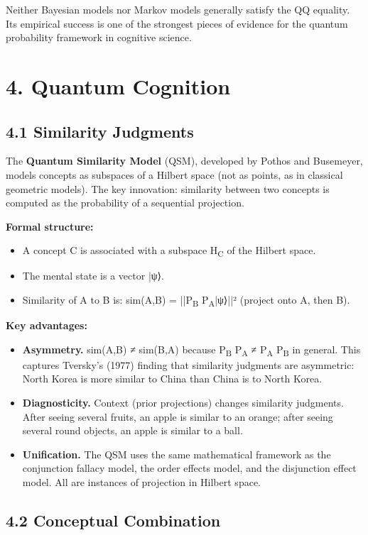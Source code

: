 \documentclass[11pt]{article}
\begin{document}
Neither Bayesian models nor Markov models generally satisfy the QQ equality.
Its empirical success is one of the strongest pieces of evidence for the quantum
probability framework in cognitive science.
\section{4. Quantum Cognition}
\label{sec:org7e47156}

\subsection{4.1 Similarity Judgments}
\label{sec:orgdca1fda}

The \textbf{Quantum Similarity Model} (QSM), developed by Pothos and Busemeyer, models
concepts as subspaces of a Hilbert space (not as points, as in classical geometric
models). The key innovation: similarity between two concepts is computed as the
probability of a sequential projection.

\textbf{Formal structure:}
\begin{itemize}
\item A concept C is associated with a subspace H\textsubscript{C} of the Hilbert space.
\item The mental state is a vector |ψ⟩.
\item Similarity of A to B is: sim(A,B) = ||P\textsubscript{B} P\textsubscript{A}|ψ⟩||² (project onto A, then B).
\end{itemize}

\textbf{Key advantages:}
\begin{itemize}
\item \textbf{Asymmetry.} sim(A,B) ≠ sim(B,A) because P\textsubscript{B} P\textsubscript{A} ≠ P\textsubscript{A} P\textsubscript{B} in general. This
captures Tversky's (1977) finding that similarity judgments are asymmetric:
North Korea is more similar to China than China is to North Korea.
\item \textbf{Diagnosticity.} Context (prior projections) changes similarity judgments. After
seeing several fruits, an apple is similar to an orange; after seeing several
round objects, an apple is similar to a ball.
\item \textbf{Unification.} The QSM uses the same mathematical framework as the conjunction
fallacy model, the order effects model, and the disjunction effect model. All
are instances of projection in Hilbert space.
\end{itemize}
\subsection{4.2 Conceptual Combination}
\label{sec:org4871c8f}
\end{document}
